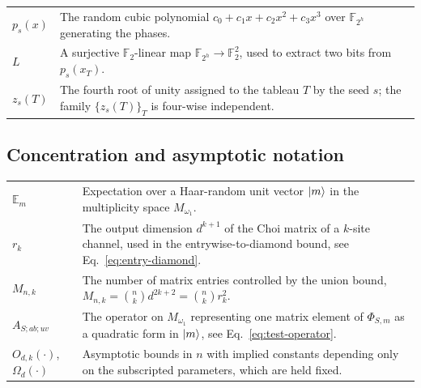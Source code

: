 \documentclass[10pt,twocolumn,superscriptaddress,aps,amsmath,amssymb,citeautoscript,floatfix,prx]{revtex4-2}
\theoremstyle{plain}
\theoremstyle{plain}
\theoremstyle{plain}
\theoremstyle{plain}
\theoremstyle{plain}
\theoremstyle{plain}
\theoremstyle{plain}
\theoremstyle{definition}
\theoremstyle{plain}
\begin{document}
\begin{appendix}
\begin{tabular}{@{}ll@{}}
\parbox[t]{0.22\textwidth}{$p_s(x)$} & \parbox[t]{0.72\textwidth}{The random cubic polynomial $c_0+c_1x+c_2x^2+c_3x^3$ over $\mathbb F_{2^h}$ generating the phases.} \\[0.6em]

\parbox[t]{0.22\textwidth}{$L$} & \parbox[t]{0.72\textwidth}{A surjective $\mathbb F_2$-linear map $\mathbb F_{2^h}\to\mathbb F_2^2$, used to extract two bits from $p_s(x_T)$.} \\[0.6em]

\parbox[t]{0.22\textwidth}{$z_s(T)$} & \parbox[t]{0.72\textwidth}{The fourth root of unity assigned to the tableau $T$ by the seed $s$; the family $\{z_s(T)\}_T$ is four-wise independent.} \\[0.6em]

\end{tabular}


\subsection*{Concentration and asymptotic notation}

\begin{tabular}{@{}ll@{}}

\parbox[t]{0.22\textwidth}{$\mathbb E_m$} & \parbox[t]{0.72\textwidth}{Expectation over a Haar-random unit vector $\ket m$ in the multiplicity space $M_{\omega_1}$.} \\[0.6em]

\parbox[t]{0.22\textwidth}{$r_k$} & \parbox[t]{0.72\textwidth}{The output dimension $d^{k+1}$ of the Choi matrix of a $k$-site channel, used in the entrywise-to-diamond bound, see Eq.~\eqref{eq:entry-diamond}.} \\[0.6em]

\parbox[t]{0.22\textwidth}{$M_{n,k}$} & \parbox[t]{0.72\textwidth}{The number of matrix entries controlled by the union bound, $M_{n,k}=\binom nkd^{2k+2}=\binom nkr_k^2$.} \\[0.6em]

\parbox[t]{0.22\textwidth}{$A_{S;ab;uv}$} & \parbox[t]{0.72\textwidth}{The operator on $M_{\omega_1}$ representing one matrix element of $\Phi_{S,m}$ as a quadratic form in $\ket m$, see Eq.~\eqref{eq:test-operator}.} \\[0.6em]

\parbox[t]{0.22\textwidth}{$O_{d,k}(\cdot)$, $\Omega_d(\cdot)$} & \parbox[t]{0.72\textwidth}{Asymptotic bounds in $n$ with implied constants depending only on the subscripted parameters, which are held fixed.} \\[0.6em]


\end{tabular}
\end{appendix}
\end{document}
